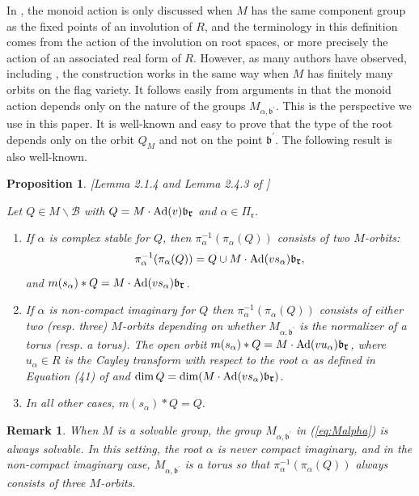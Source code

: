 \documentclass[12pt]{amsart}
\numberwithin{equation}{section}
\newtheorem{prop}[thm]{Proposition}
\newtheorem{rem}[thm]{Remark}
\newcommand{\fr}{\mbox{${\mathfrak r}$}}
\newcommand{\fb}{\mbox{${\mathfrak b}$}}
\newcommand{\Ad}{{\rm Ad}}
\newcommand{\B}{\mathcal{B}}
\newcommand{\ms}{m(s_{\alpha})}
\begin{document}
In \cite{RS}, the monoid action is only discussed when $M$ has the same component group as the fixed points of an involution of $R$, and the terminology in this definition comes from the action of the involution on root spaces, or more precisely the action of an associated real form of $R$.   However, as many authors have observed, including \cite{Knoporbits}, the construction works in the same way when $M$ has finitely many orbits on the flag variety.  
 It follows easily from arguments in \cite{RScomp} that the monoid action depends only on the nature of the groups $M_{\alpha, \fb^{\prime}}.$   This is the perspective we use in this paper. 
It is well-known and easy to prove that the type of the root depends only on the orbit $Q_M$ and not on the point $\fb^{\prime}.$ The following result is also well-known. 

\begin{prop}\label{p:stableandnc} \emph{[Lemma 2.1.4 and Lemma 2.4.3 of \cite{RScomp}]}

Let $Q\in M\backslash\B$ with $Q=M\cdot \Ad(v)\fb_{\fr}$ and $\alpha\in \Pi_{\fr}$.
\begin{enumerate}
\item If $\alpha$ is complex stable for $Q$, then $\pi_{\alpha}^{-1}(\pi_{\alpha}(Q))$ consists of two $M$-orbits:
$$
\pi_{\alpha}^{-1}(\pi_{\alpha}(Q))=Q\cup M\cdot \Ad(vs_{\alpha})\fb_{\fr},
$$
and $\ms*Q= M\cdot \Ad(vs_{\alpha})\fb_{\fr}$. 
\item If $\alpha$ is non-compact imaginary for $Q$ then $\pi_{\alpha}^{-1}(\pi_{\alpha}(Q))$ consists of either two (resp. three) $M$-orbits depending on whether $M_{\alpha, \fb^{\prime}}$ is the normalizer of a torus (resp. a torus). The open orbit
$\ms*Q=M\cdot \Ad(vu_{\alpha})\fb_{\fr}$, where $u_{\alpha}\in R$ is the Cayley transform with respect to the root $\alpha$ as defined in Equation (41) of \cite{CEexp} and $\dim Q=\dim (M\cdot \Ad(vs_{\alpha})\fb_{\fr})$.   
\item In all other cases, $m(s_{\alpha})*Q=Q.$
\end{enumerate}
\end{prop}
\begin{rem}\label{r:solvablecase} 
When $M$ is a solvable group, the group $M_{\alpha, \fb^{\prime}}$ in (\ref{eq:Malpha}) is always solvable.  In this setting, the root $\alpha$ is \emph{never} compact imaginary, and in the non-compact imaginary case,  $M_{\alpha,\fb^{\prime}}$ is a torus so that $\pi_{\alpha}^{-1}(\pi_{\alpha}(Q))$ always consists of three $M$-orbits. 
\end{rem}
\end{document}
